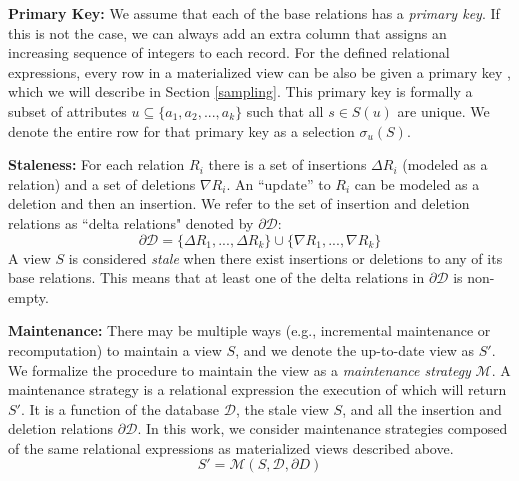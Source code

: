 \noindent \textbf{Primary Key: } We assume that each of the base relations has a \emph{primary key}. If this is not the case, we can always add an extra column 
that assigns an increasing sequence of integers to each record.
For the defined relational expressions, every row in a materialized view can be also be given a primary key \cite{DBLP:journals/vldb/CuiW03, DBLP:conf/sigmod/ZengGMZ14},
which we will describe in Section \ref{sampling}. 
This primary key is formally a subset of attributes $u \subseteq \{a_1,a_2,...,a_k\}$ such that all $s \in S(u)$ are unique.
We denote the entire row for that primary key as a selection $\sigma_u(S)$.

\vspace{.25em}

\noindent \textbf{Staleness: } For each relation $R_i$ there is a set of insertions $\Delta R_i$ (modeled as a relation)
and a set of deletions $\nabla R_i$.
An ``update'' to $R_i$ can be modeled as a deletion and then an insertion.
We refer to the set of insertion and deletion relations as ``delta relations" denoted by $\partial \mathcal{D}$:
\[
	\partial \mathcal{D} = \{\Delta R_1,...,\Delta R_k\} \cup \{\nabla R_1,...,\nabla R_k\}
\]
A view $S$ is considered \emph{stale} when there exist insertions or deletions to any of its base relations.
This means that at least one of the delta relations in $\partial \mathcal{D}$ is non-empty.

\vspace{.25em}

\noindent \textbf{Maintenance: } There may be multiple ways (e.g., incremental maintenance or recomputation) to maintain a view $S$, and we denote the up-to-date view as $S'$.
We formalize the procedure to maintain the view as a \emph{maintenance strategy} $\mathcal{M}$.
A maintenance strategy is a relational expression the execution of which will return $S'$.
It is a function of the database $\mathcal{D}$, the stale view $S$, and all the insertion and deletion relations $\partial \mathcal{D}$. 
In this work, we consider maintenance strategies composed of the same relational expressions as materialized views described above.
\[
S' = \mathcal{M}(S,\mathcal{D}, \partial D)
\]

\vspace{.25em}

